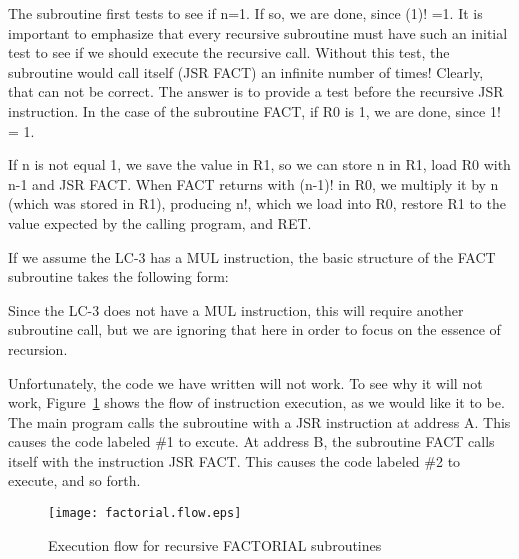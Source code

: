 \documentclass{patt}
\begin{document}
The subroutine first tests to see if n=1.  If so, we are done, 
since (1)! =1.  It is important to emphasize that every recursive subroutine 
must have such an initial test to see if we should execute the recursive call. 
Without this test, the subroutine would call itself (JSR FACT) 
an infinite number of times!  Clearly, that can not be correct.  The answer 
is to provide a test before the recursive JSR instruction.  In the case of the
subroutine FACT, if R0 is 1, we are done, since 1! = 1.

If n is not equal 1, we save the value in R1, so we can store n in R1, 
load R0 with n-1 and JSR FACT.  When
FACT returns with (n-1)! in R0, we multiply it by n (which was stored in R1),
producing n!, which we load into R0, restore R1 to the value expected by the
calling program, and RET.  

If we assume the LC-3 has a MUL instruction, the basic structure of the FACT
subroutine takes the following form:


Since the LC-3 does not have a MUL instruction, this will require another 
subroutine call, but we are ignoring that here in order to focus on the 
essence of recursion.

Unfortunately, the code we have written will not work.  To see why it will not 
work, Figure~\ref{fig:factorial.flow} shows the flow of instruction execution, 
as we would like
it to be.  The main program calls the subroutine with a JSR instruction at 
address A.  This causes the 
code labeled \#1 to excute.  At address B, the subroutine FACT calls itself 
with the instruction JSR FACT.  This causes the code labeled \#2 to execute, 
and so forth.

\begin{figure}[h]
\centerline{\texttt{[image: factorial.flow.eps]}}
\caption{Execution flow for recursive FACTORIAL subroutines}
\label{fig:factorial.flow}
\end{figure}
\end{document}
